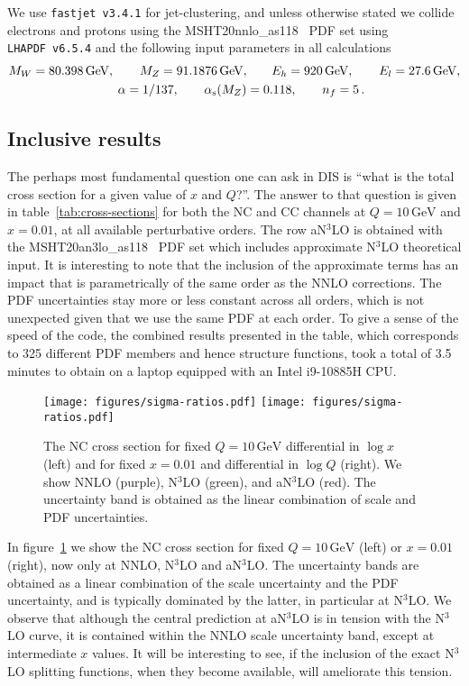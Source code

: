 \documentclass[submission, PhysCodeb]{SciPost_better_arXiv}
\newcommand{\as}{\alpha_{\mathrm{s}}}
\newcommand{\GEV}{\,\mathrm{GeV}}
\newcommand{\NNNLO}{N$^3$LO}
\begin{document}
We use {\tt fastjet~v3.4.1} for jet-clustering, and unless otherwise
stated we collide electrons and protons using the
MSHT20nnlo\_as118~\cite{Bailey:2020ooq} PDF set using {\tt
  LHAPDF~v6.5.4} and the following input parameters in all
calculations
\begin{align}
  \label{eq:setup}
  M_W = 80.398\GEV, \qquad M_Z = 91.1876\GEV, &\qquad E_h = 920\GEV, \qquad E_l = 27.6\GEV,  \\ \notag
  \alpha = 1/137, \qquad \as(M_Z) &= 0.118, \qquad n_f = 5\,.
\end{align}

\subsection{Inclusive results}
The perhaps most fundamental question one can ask in DIS is ``what is
the total cross section for a given value of $x$ and $Q$?''. The
answer to that question is given in table~\ref{tab:cross-sections} for
both the NC and CC channels at $Q=10\GEV$ and $x=0.01$, at all
available perturbative orders.  The row a\NNNLO{} is obtained with the
MSHT20an3lo\_as118~\cite{McGowan:2022nag} PDF set which includes
approximate \NNNLO{} theoretical input. It is interesting to note that
the inclusion of the approximate terms has an impact that is
parametrically of the same order as the NNLO corrections. The PDF
uncertainties stay more or less constant across all orders, which is
not unexpected given that we use the same PDF at each order. To give a
sense of the speed of the code, the combined results presented in the
table, which corresponds to 325 different PDF members and hence
structure functions, took a total of 3.5 minutes to obtain on a laptop
equipped with an Intel i9-10885H CPU.
\begin{figure}[tb!]
  \centering\texttt{[image: figures/sigma-ratios.pdf]}
  \centering\texttt{[image: figures/sigma-ratios.pdf]}
  \caption{The NC cross section for fixed $Q=10\GEV$ differential in
    $\log x$ (left) and for fixed $x=0.01$ and differential in $\log
    Q$ (right). We show NNLO (purple), \NNNLO{} (green), and a\NNNLO{}
    (red). The uncertainty band is obtained as the linear combination
    of scale and PDF uncertainties.}
  \label{fig:sigma}
\end{figure}

In figure~\ref{fig:sigma} we show the NC cross section for fixed
$Q=10\GEV$ (left) or $x=0.01$ (right), now only at NNLO, \NNNLO{} and
a\NNNLO{}. The uncertainty bands are obtained as a linear combination
of the scale uncertainty and the PDF uncertainty, and is typically
dominated by the latter, in particular at \NNNLO{}. We observe that
although the central prediction at a\NNNLO{} is in tension with the
\NNNLO{} curve, it is contained within the NNLO scale uncertainty
band, except at intermediate $x$ values. It will be interesting to
see, if the inclusion of the exact \NNNLO{} splitting functions, when
they become available, will ameliorate this tension.
\end{document}

